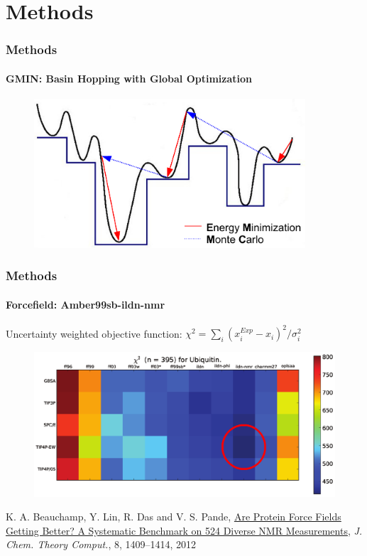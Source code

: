 \documentclass[english]{beamer}
\begin{document}




\section{Methods}

\begin{frame}
    \frametitle{Methods}
    \framesubtitle{GMIN: Basin Hopping with Global Optimization}

    \begin{figure}
        \includegraphics[width=0.9\textwidth]{figures/GMIN/GMIN.pdf}
    \end{figure}        

\end{frame}    


\begin{frame}
    \frametitle{Methods}
    \framesubtitle{Forcefield: Amber99sb-ildn-nmr}

    Uncertainty weighted objective function: $\chi^2 = \sum_i(x_i^{Exp} - x_i)^2 / \sigma_i^2$

    \begin{figure}
        \includegraphics[width=\linewidth]{figures/forcefield_performance.png}
    \end{figure}        

    \tiny
    K. A. Beauchamp, Y. Lin, R. Das and V. S. Pande,
    \href{http://pubs.acs.org/doi/abs/10.1021/ct2007814}
    {Are Protein Force Fields Getting Better?
    A Systematic Benchmark on 524 Diverse NMR Measurements},
    \textit{J. Chem. Theory Comput.},
    8, 1409--1414, 2012
    

\end{frame}   
\end{document}
